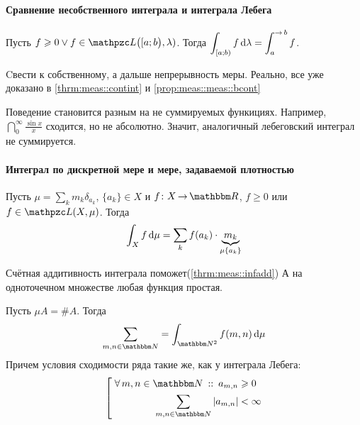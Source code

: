 \documentclass[draft, timbord]{longnotes}
\begin{document}
\paragraph{Сравнение несобственного интеграла и интеграла Лебега}
\label{par:meas::impleb}

\begin{thrm}\label{thrm:meas::impleb}
  Пусть $f \geqslant 0 \lor f \in \summb\bigl([a;b\bigr),\lambda)$. Тогда
  $\displaystyle \int_{[a;b)} f \, \del \lambda = \int _a ^{\to b} f$.
\end{thrm}
\begin{tproof}
  Cвести к собственному, а дальше непрерывность меры.
  Реально, все уже  доказано в \ref{thrm:meas::contint} и \ref{prop:meas::meas::bcont}
\end{tproof}

Поведение становится разным на не суммируемых функициях.
Например, $\dint_0^\infty \frac{\sin x}{x}$ сходится, но не абсолютно.
Значит, аналогичный лебеговский интеграл не суммируется.

\paragraph{Интеграл по дискретной мере и мере, задаваемой плотностью}
\label{par:meas::discint}

\begin{thrm}\label{thrm:meas::discint::mol}
  Пусть $\mu = \sum_{k} m_k \delta_{a_k}$, $\{a_k\} \in X$ и  $f\colon X \to \R$, 
  $f \geqslant 0$ или $f\in \summb (X,\mu)$.
  Тогда \[
    \int_X f \, \mathrm{d} \mu = \sum_{k} f(a_k) \cdot \underbrace{m_k}_{\mu \{a_k\}}
  \]
\end{thrm}

\begin{tproof}
  Счётная аддитивность интеграла поможет(\ref{thrm:meas::infadd})
  А на одноточечном множестве любая функция простая.
\end{tproof}


\begin{exmp}\label{exmp:meas::discint::series}
  Пусть $\mu A=\#A$. Тогда \[
    \sum_{m,n\in\N} = \int _{\N^2} f(m,n) \, \del \mu
  \]
  Причем условия сходимости  
  ряда такие же, как у интеграла Лебега: 
  \[
    \left[\;
    \begin{aligned}
      \forall\, m,n\in \N \holds a_{m,n} &\geqslant 0 \\
      \sum_{m,n\in\N} |a_{m,n}| &< \infty \\
    \end{aligned} \right.
  \]
\end{exmp}
\end{document}
